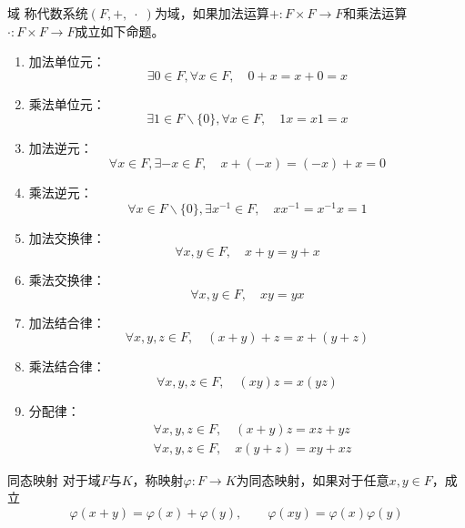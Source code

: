 \documentclass[lang = cn, scheme = chinese, thmcnt = section, usesamecnt]{elegantbook}
\begin{document}
\begin{definition}{域}
	称代数系统$(F,+,\;\cdot\;)$为域，如果加法运算$+:F\times F\to F$和乘法运算$\cdot :F\times F\to F$成立如下命题。
	\begin{enumerate}
		\item 加法单位元：
		$$
		\exists 0\in F,\forall x\in F,\quad 0+x=x+0=x
		$$
		\item 乘法单位元：
		$$
		\exists 1\in F\backslash\{0\},\forall x\in F,\quad 1x=x1=x
		$$
		\item 加法逆元：
		$$
		\forall x\in F,\exists-x\in F,\quad x+(-x)=(-x)+x=0
		$$
		\item 乘法逆元：
		$$
		\forall x\in F\backslash\{0\},\exists x^{-1}\in F,\quad xx^{-1}=x^{-1}x=1
		$$
		\item 加法交换律：
		$$
		\forall x,y\in F,\quad x+y=y+x
		$$
		\item 乘法交换律：
		$$
		\forall x,y\in F,\quad xy=yx
		$$
		\item 加法结合律：
		$$
		\forall x,y,z\in F,\quad (x+y)+z=x+(y+z)
		$$
		\item 乘法结合律：
		$$
		\forall x,y,z\in F,\quad (xy)z=x(yz)
		$$
		\item 分配律：
		\begin{align*}
			&\forall x,y,z\in F,\quad (x+y)z=xz+yz\\
			&\forall x,y,z\in F,\quad x(y+z)=xy+xz
		\end{align*}
	\end{enumerate}
\end{definition}

\begin{definition}{同态映射}
	对于域$F$与$K$，称映射$\varphi:F\to K$为同态映射，如果对于任意$x,y\in F$，成立%
	$$
	\varphi(x+y)=\varphi(x)+\varphi(y),\qquad
	\varphi(xy)=\varphi(x)\varphi(y)
	$$
\end{definition}
\end{document}
